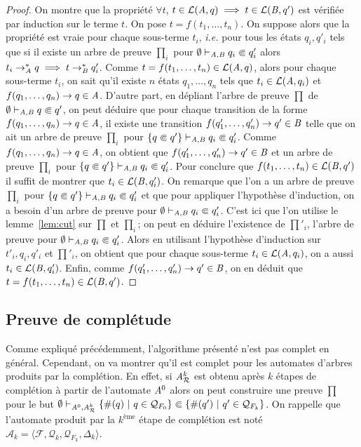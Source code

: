 \begin{proof}
  On montre que la propriété $\forall t$, $t \in \mathcal{L}(\mathit A, q) \; \Longrightarrow \; t \in \mathcal{L}(\mathit B, q')$ est vérifiée par
  induction sur le terme $t$. On pose $t = f(t_1, \dots, t_n)$. 
  On suppose alors que la propriété est vraie pour chaque sous-terme 
  $t_i$, \textit{i.e.} pour tous les états  $q_i, q'_i$ tels que si il existe un arbre de
  preuve $\prod_i$ pour $\emptyset \vdash_{\mathit A, \mathit B} q_i \Subset q'_i$ alors $t_i
  \rightarrow^*_{\mathit A} q \; \Longrightarrow \; t \rightarrow^*_{\mathit B} q_i'$. Comme $t=f(t_1, \dots,
  t_n) \in \mathcal{L}(\mathit A, q)$, alors pour chaque sous-terme $t_i$, on sait qu'il existe $n$ états 
  $q_1, \ldots, q_n$ tels que $t_i \in \mathcal{L}(\mathit A, q_i)$ et $f(q_1, \dots, q_n)
  \rightarrow q \in \mathit A$. D'autre part, en dépliant  l'arbre de preuve $\prod$ de
  $\emptyset \vdash_{\mathit A, \mathit B} q \Subset q'$, on peut déduire que pour chaque transition
  de la forme $f(q_1, \dots, q_n) \rightarrow q \in \mathit A$, il existe une transition $f(q'_1,
  \dots, q'_n) \rightarrow q' \in \mathit B$ telle que on ait un arbre de preuve $\prod_i$ pour
  $\{q \Subset q'\} \vdash_{\mathit A, \mathit B} q_i \Subset q'_i$. 
  Comme $f(q_1, \ldots, q_n) \rightarrow q \in \mathit A$, on obtient que $f(q'_1, \dots, q'_n)
  \rightarrow q' \in \mathit B$ et un arbre de preuve $\prod_i$ pour $\{q \Subset q'\} \vdash_{\mathit A,
    \mathit B} q_i \Subset q'_i$. Pour conclure que $f(t_1, \dots, t_n) \in \mathcal{L}(\mathit B,
  q')$ il suffit de montrer que  $t_i \in \mathcal{L}(\mathit B, q'_i)$. On remarque que l'on a 
  un arbre de preuve $\prod_i$ pour $\{q \Subset q'\} \vdash_{\mathit A,\mathit B} q_i \Subset q'_i$
  et que pour appliquer l'hypothèse d'induction, on a besoin d'un arbre de preuve pour
  $\emptyset \vdash_{\mathit A,\mathit B} q_i \Subset q'_i$. C'est ici que l'on utilise le lemme~\ref{lem:cut} sur $\prod$
  et $\prod_i$; on peut en déduire l'existence de $\prod'_i$, l'arbre de preuve pour
  $\emptyset \vdash_{\mathit A, \mathit B} q_i \Subset q'_i$. Alors en utilisant l'hypothèse d'induction sur
  $t'_i, q_i, q'_i$ et $\prod'_i$,
  on obtient que pour chaque sous-terme $t_i \in \mathcal{L}(\mathit A, q_i)$, on a aussi $t_i \in
  \mathcal{L}(\mathit B, q'_i)$. Enfin, comme $f(q'_1, \ldots, q'_n)\rightarrow q' \in \mathit B$, on en déduit que
  $t=f(t_1, \dots, t_n) \in \mathcal{L}(\mathit B, q')$.
\end{proof}



\subsection{Preuve de complétude}
\label{sec:completness}

Comme expliqué précédemment, l'algorithme présenté n'est pas complet en général.
Cependant, on va montrer qu'il est complet pour les automates d'arbres produits par
la complétion. En effet, si $\mathit A_\mathcal R^k$ est obtenu après  $k$
étapes de complétion à partir de l'automate $\mathit A^0$ alors on peut construire une preuve $\prod$ pour 
le but $\emptyset \vdash_{\mathit A^0, \mathit A^k_{\mathcal R}} \{\#(q)\ |\ q \in
\mathcal{Q}_{F_0}\} \Subset \{\#(q')\ |\ q'\in
\mathcal{Q}_{F_k}\}$. On rappelle que l'automate produit par la 
$k^\text{ème}$ étape de complétion est noté $\mathcal{A}_k = \langle
\mathcal{F}, \mathcal{Q}_k, \mathcal{Q}_{F_k}, \Delta_k\rangle$.

